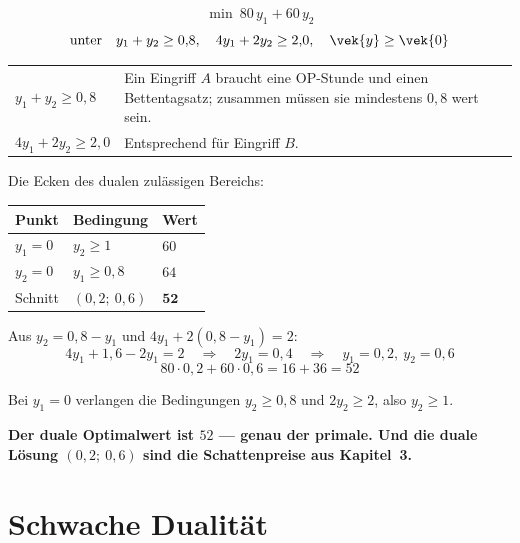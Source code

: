 \begin{merksatz}
\[ \min\ 80\,y_1 + 60\,y_2 \]
\[ \text{unter}\quad y_1+y_2 \ge 0{,}8, \quad 4y_1+2y_2 \ge 2{,}0, \quad \vek{y}\ge\vek{0} \]

\begin{center}
\renewcommand{\arraystretch}{1.5}
\begin{tabular}{@{}P{2.8cm}P{5.8cm}@{}}
\toprule
$y_1+y_2\ge0{,}8$ & Ein Eingriff $A$ braucht eine OP-Stunde und einen Bettentagsatz; zusammen müssen sie mindestens $0{,}8$ wert sein.\\
$4y_1+2y_2\ge2{,}0$ & Entsprechend für Eingriff $B$.\\
\bottomrule
\end{tabular}
\end{center}

Die Ecken des dualen zulässigen Bereichs:
\begin{center}
{\small
\renewcommand{\arraystretch}{1.48}
\begin{tabular}{@{}P{2.6cm}P{2.4cm}P{2.2cm}@{}}
\toprule
\textbf{Punkt} & \textbf{Bedingung} & \textbf{Wert}\\
\midrule
$y_1=0$ & $y_2 \ge 1$ & $60$\\
$y_2=0$ & $y_1 \ge 0{,}8$ & $64$\\
Schnitt & $(0{,}2;\ 0{,}6)$ & $\mathbf{52}$\\
\bottomrule
\end{tabular}}
\end{center}

 Aus $y_2 = 0{,}8-y_1$ und $4y_1+2(0{,}8-y_1) = 2$:
\[ 4y_1 + 1{,}6 - 2y_1 = 2 \quad\Longrightarrow\quad 2y_1 = 0{,}4 \quad\Longrightarrow\quad y_1 = 0{,}2,\ y_2 = 0{,}6 \]
\[ 80\cdot0{,}2 + 60\cdot0{,}6 = 16+36 = 52 \]

 Bei $y_1=0$ verlangen die Bedingungen $y_2 \ge 0{,}8$ und $2y_2 \ge 2$, also $y_2 \ge 1$.

\begin{center}
\begin{minipage}{0.9\textwidth}
\textbf{Der duale Optimalwert ist $52$ --- genau der primale. Und die duale Lösung $(0{,}2;\ 0{,}6)$ sind die Schattenpreise aus Kapitel~3.}
\end{minipage}
\end{center}
\end{merksatz}

\section{Schwache Dualität}

